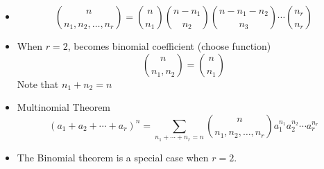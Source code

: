 \documentclass[slidestop,compress,mathserif]{beamer}
\begin{document}
\begin{frame}%

\begin{itemize}
\item
\[
{n \choose n_1, n_2, \ldots, n_r} = {n \choose n_1}{n-n_1 \choose n_2}{n-n_1-n_2 \choose n_3}\cdots{n_r \choose n_r}
\]
\pause

\item When $r = 2$, becomes binomial coefficient (choose function)
\[
{n \choose n_1, n_2} = {n \choose n_1}
\]
Note that $n_1 + n_2 = n$

\pause
\item Multinomial Theorem
\[
(a_1 + a_2 + \cdots + a_r)^n = \sum_{n_1 + \cdots + n_r = n} {n \choose n_1, n_2, \ldots, n_r} a_1^{n_1} a_2^{n_2} \cdots a_r^{n_r}
\]

\pause
\item The Binomial theorem is a special case when $r = 2$.
\end{itemize}

\end{frame}

\end{document}
